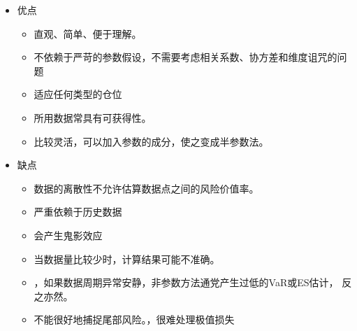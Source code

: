 \begin{itemize}
    \item 优点
    \begin{itemize}
    \item 直观、简单、便于理解。
    \item 不依赖于严苛的参数假设，不需要考虑相关系数、协方差和维度诅咒的问题
    \item 适应任何类型的仓位
    \item 所用数据常具有可获得性。
    \item 比较灵活，可以加入参数的成分，使之变成半参数法。
    \end{itemize}

    \item 缺点
    \begin{itemize}

    \item 数据的离散性不允许估算数据点之间的风险价值率。
    \item 严重依赖于历史数据
    \item 会产生鬼影效应
    \item 当数据量比较少时，计算结果可能不准确。
    \item ，如果数据周期异常安静，非参数方法通党产生过低的VaR或ES估计，
    反之亦然。
    
    \item 不能很好地捕捉尾部风险。，很难处理极值损失
    \end{itemize}
\end{itemize}

